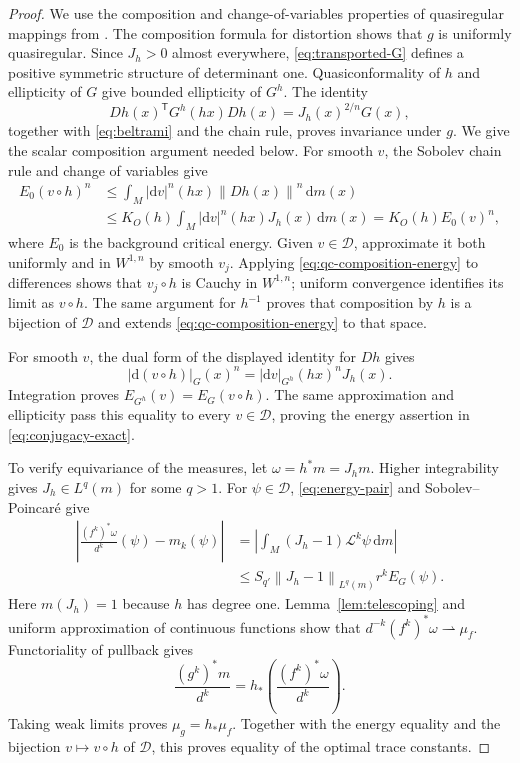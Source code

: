 \documentclass[11pt,reqno]{amsart}
\theoremstyle{plain}
\theoremstyle{definition}
\theoremstyle{remark}
\newcommand{\Lop}{\mathcal L}
\newcommand{\Dcal}{\mathcal D}
\newcommand{\norm}[1]{\left\lVert #1\right\rVert}
\newcommand{\dd}{\mathrm d}
\numberwithin{equation}{section}
\begin{document}
\begin{proof}
We use the composition and change-of-variables properties of quasiregular mappings from \cite{Rickman93}. The composition formula for distortion shows that $g$ is uniformly quasiregular. Since $J_h>0$ almost everywhere, \eqref{eq:transported-G} defines a positive symmetric structure of determinant one. Quasiconformality of $h$ and ellipticity of $G$ give bounded ellipticity of $G^h$. The identity
\[
 Dh(x)^{\mathsf T}G^h(hx)Dh(x)=J_h(x)^{2/n}G(x),
\]
together with \eqref{eq:beltrami} and the chain rule, proves invariance under $g$. We give the scalar composition argument needed below. For smooth $v$, the Sobolev chain rule and change of variables give
\begin{equation}\label{eq:qc-composition-energy}
 \begin{split}
 E_0(v\circ h)^n
 &\le \int_M |\dd v|^n(hx)\norm{Dh(x)}^n\,\dd m(x)\\
 &\le K_O(h)\int_M |\dd v|^n(hx)J_h(x)\,\dd m(x)
 =K_O(h)E_0(v)^n,
 \end{split}
\end{equation}
where $E_0$ is the background critical energy. Given $v\in\Dcal$, approximate it both uniformly and in $W^{1,n}$ by smooth $v_j$. Applying \eqref{eq:qc-composition-energy} to differences shows that $v_j\circ h$ is Cauchy in $W^{1,n}$; uniform convergence identifies its limit as $v\circ h$. The same argument for $h^{-1}$ proves that composition by $h$ is a bijection of $\Dcal$ and extends \eqref{eq:qc-composition-energy} to that space.

For smooth $v$, the dual form of the displayed identity for $Dh$ gives
\[
 |\dd(v\circ h)|_G(x)^n
 =|\dd v|_{G^h}(hx)^nJ_h(x).
\]
Integration proves $E_{G^h}(v)=E_G(v\circ h)$. The same approximation and ellipticity pass this equality to every $v\in\Dcal$, proving the energy assertion in \eqref{eq:conjugacy-exact}.

To verify equivariance of the measures, let $\omega=h^*m=J_hm$. Higher integrability gives $J_h\in L^q(m)$ for some $q>1$. For $\psi\in\Dcal$, \eqref{eq:energy-pair} and Sobolev--Poincar\'e give
\begin{align*}
 \left|\frac{(f^k)^*\omega}{d^k}(\psi)-m_k(\psi)\right|
 &=\left|\int_M(J_h-1)\Lop^k\psi\,\dd m\right|\\
 &\le S_{q'}\norm{J_h-1}_{L^q(m)}r^kE_G(\psi).
\end{align*}
Here $m(J_h)=1$ because $h$ has degree one. Lemma~\ref{lem:telescoping} and uniform approximation of continuous functions show that $d^{-k}(f^k)^*\omega\rightharpoonup\mu_f$. Functoriality of pullback gives
\[
 \frac{(g^k)^*m}{d^k}
 =h_*\left(\frac{(f^k)^*\omega}{d^k}\right).
\]
Taking weak limits proves $\mu_g=h_*\mu_f$. Together with the energy equality and the bijection $v\mapsto v\circ h$ of $\Dcal$, this proves equality of the optimal trace constants.


\end{proof}
\end{document}
